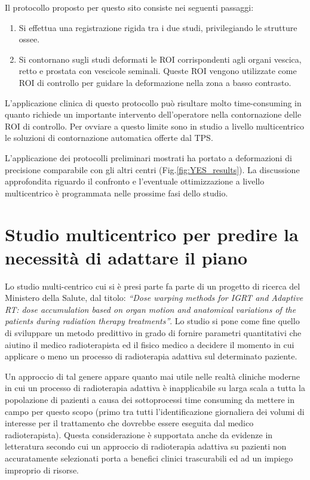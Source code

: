 Il protocollo proposto per questo sito consiste nei seguenti passaggi:
\begin{enumerate}
\item Si effettua una registrazione rigida tra i due studi, privilegiando le strutture ossee.
\item Si contornano sugli studi deformati le ROI corrispondenti agli organi vescica, retto e prostata con vescicole seminali. Queste ROI vengono utilizzate come ROI di controllo per guidare la deformazione nella zona a basso contrasto.
\end{enumerate}
L'applicazione clinica di questo protocollo può risultare molto time-consuming in quanto richiede un importante intervento dell'operatore nella contornazione delle ROI di controllo. Per ovviare a questo limite sono in studio a livello multicentrico le soluzioni di contornazione automatica offerte dal TPS.


L'applicazione dei protocolli preliminari mostrati ha portato a deformazioni di precisione comparabile con gli altri centri (Fig.\ref{fig:YES_results}). La discussione approfondita riguardo il confronto e l'eventuale ottimizzazione a livello multicentrico è programmata nelle prossime fasi dello studio.


\section{Studio multicentrico per predire la necessità di adattare il piano}
Lo studio multi-centrico cui si è presi parte fa parte di un progetto di ricerca del Ministero della Salute, dal titolo: \textit{``Dose warping methods for IGRT and Adaptive RT: dose accumulation based on organ motion and anatomical variations of the patients during radiation therapy treatments''}. Lo studio si pone come fine quello di sviluppare un metodo predittivo in grado di fornire parametri quantitativi che aiutino il medico radioterapista ed il fisico medico a decidere il momento in cui applicare o meno un processo di radioterapia adattiva sul determinato paziente.

Un approccio di tal genere appare quanto mai utile nelle realtà cliniche moderne in cui un processo di radioterapia adattiva è inapplicabile su larga scala a tutta la popolazione di pazienti a causa dei sottoprocessi time consuming da mettere in campo per questo scopo (primo tra tutti l'identificazione giornaliera dei volumi di interesse per il trattamento che dovrebbe essere eseguita dal medico radioterapista). Questa considerazione è supportata anche da evidenze in letteratura \cite{Capelle2012} secondo cui un approccio di radioterapia adattiva su pazienti non accuratamente selezionati porta a benefici clinici trascurabili ed ad un impiego improprio di risorse.


